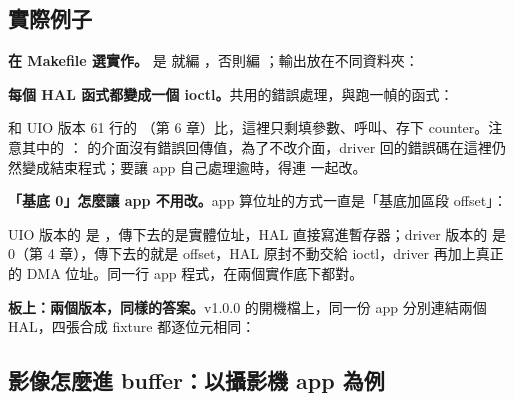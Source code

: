 \subsection{實際例子}

\textbf{在 Makefile 選實作。} 是  就編 ，否則編 ；輸出放在不同資料夾：


\textbf{每個 HAL 函式都變成一個 ioctl。}共用的錯誤處理，與跑一幀的函式：


和 UIO 版本 61 行的 （第 6 章）比，這裡只剩填參數、呼叫、存下 counter。注意其中的 ： 的介面沒有錯誤回傳值，為了不改介面，driver 回的錯誤碼在這裡仍然變成結束程式；要讓 app 自己處理逾時，得連  一起改。

\textbf{「基底 0」怎麼讓 app 不用改。}app 算位址的方式一直是「基底加區段 offset」：


UIO 版本的  是 ，傳下去的是實體位址，HAL 直接寫進暫存器；driver 版本的  是 0（第 4 章），傳下去的就是 offset，HAL 原封不動交給 ioctl，driver 再加上真正的 DMA 位址。同一行 app 程式，在兩個實作底下都對。

\textbf{板上：兩個版本，同樣的答案。}v1.0.0 的開機檔上，同一份 app 分別連結兩個 HAL，四張合成 fixture 都逐位元相同：


\subsection{影像怎麼進 buffer：以攝影機 app 為例}

